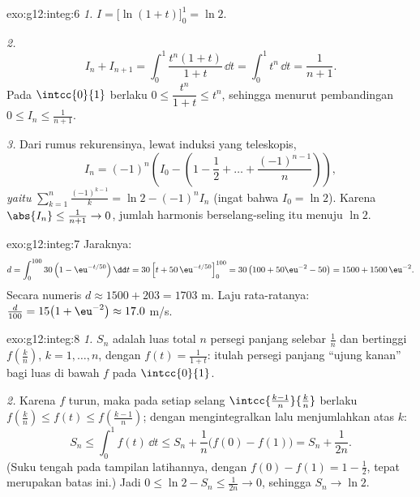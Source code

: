 \begin{solution}{exo:g12:integ:6}
\emph{1.} $I = \bigl[\ln(1+t)\bigr]_0^1 = \ln 2$.

\emph{2.}
\[
I_n + I_{n+1} = \int_0^1 \frac{t^n(1 + t)}{1+t}\,\dd t
= \int_0^1 t^n \,\dd t = \frac{1}{n+1}.
\]
Pada $\intcc{0}{1}$ berlaku $0 \leq \dfrac{t^n}{1+t} \leq t^n$, sehingga menurut
pembandingan $0 \leq I_n \leq \frac{1}{n+1}$.

\emph{3.} Dari rumus rekurensinya, lewat induksi yang teleskopis,
\[
I_n = (-1)^n\left(I_0 - \left(1 - \frac12 + \dots + \frac{(-1)^{n-1}}{n}\right)\right),
\]
\emph{yaitu}
$\displaystyle\sum_{k=1}^{n} \frac{(-1)^{k-1}}{k} = \ln 2 - (-1)^n I_n$
(ingat bahwa $I_0 = \ln 2$). Karena $\abs{I_n} \leq \frac{1}{n+1} \to 0$, jumlah
harmonis berselang-seling itu menuju $\ln 2$.
\end{solution}

\begin{solution}{exo:g12:integ:7}
Jaraknya:
\[
d = \int_0^{100} 30\left(1 - \eu^{-t/50}\right)\dd t
= 30\left[t + 50\,\eu^{-t/50}\right]_0^{100}
= 30\left(100 + 50\eu^{-2} - 50\right)
= 1500 + 1500\,\eu^{-2}.
\]
Secara numeris $d \approx 1500 + 203 = 1703$ m. Laju rata-ratanya:
$\frac{d}{100} = 15\bigl(1 + \eu^{-2}\bigr) \approx 17.0$ m/s.
\end{solution}

\begin{solution}{exo:g12:integ:8}
\emph{1.} $S_n$ adalah luas total $n$ persegi panjang selebar $\frac1n$ dan
bertinggi $f\left(\frac kn\right)$, $k = 1, \dots, n$, dengan
$f(t) = \frac{1}{1+t}$: itulah  persegi panjang ``ujung kanan''
bagi luas di bawah $f$ pada $\intcc{0}{1}$.

\emph{2.} Karena $f$ turun, maka pada setiap selang
$\intcc{\frac{k-1}{n}}{\frac kn}$ berlaku
$f\left(\frac kn\right) \leq f(t) \leq f\left(\frac{k-1}{n}\right)$;
dengan mengintegralkan lalu menjumlahkan atas $k$:
\[
S_n \leq \int_0^1 f(t)\,\dd t \leq S_n + \frac1n\bigl(f(0) - f(1)\bigr)
= S_n + \frac{1}{2n}.
\]
(Suku tengah pada tampilan latihannya, dengan
$f(0) - f(1) = 1 - \frac12$, tepat merupakan batas ini.) Jadi
$0 \leq \ln 2 - S_n \leq \frac{1}{2n} \to 0$, sehingga $S_n \to \ln 2$.
\end{solution}

